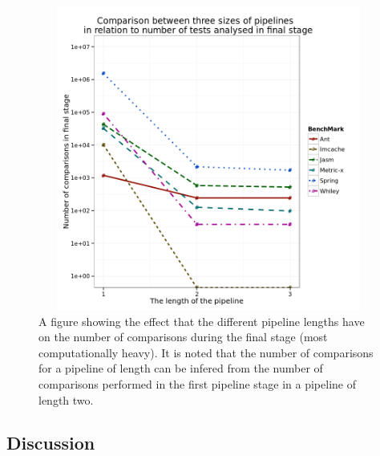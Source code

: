 \begin{figure}[!htb]
\begin{center}
\includegraphics[height=10cm, width = 14.5cm]{Pipeline.png}
\end{center}
\caption[A figure showing the effect that the different pipeline lengths have on the number of comparisons during the final stage (most computationally heavy).]{A figure showing the effect that the different pipeline lengths have on the number of comparisons during the final stage (most computationally heavy). It is noted that the number of comparisons for a pipeline of length can be infered from the number of comparisons performed in the first pipeline stage in a pipeline of length two.}
\label{fig:pipelinegraph}
\end{figure}

\subsection{Discussion}

